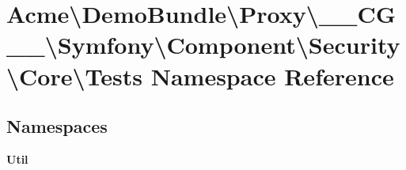 \section{Acme\textbackslash{}Demo\+Bundle\textbackslash{}Proxy\textbackslash{}\+\_\+\+\_\+\+C\+G\+\_\+\+\_\+\textbackslash{}Symfony\textbackslash{}Component\textbackslash{}Security\textbackslash{}Core\textbackslash{}Tests Namespace Reference}
\label{namespace_acme_1_1_demo_bundle_1_1_proxy_1_1_____c_g_____1_1_symfony_1_1_component_1_1_security_1_1_core_1_1_tests}
\subsection*{Namespaces}
\begin{DoxyCompactItemize}
\item 
 {\bf Util}
\end{DoxyCompactItemize}
